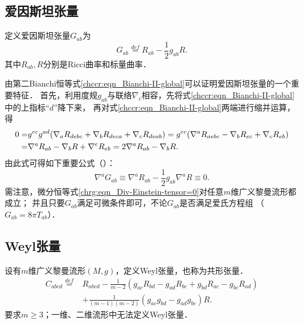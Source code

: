 \subsection{爱因斯坦张量}
定义爱因斯坦张量$G_{ab}$为
\begin{equation}\label{chrg:eqn_Einstein-tensor}
    G_{ab} \overset{def}{=} R_{ab} -\frac{1}{2}g_{ab} R .
\end{equation}
其中$R_{ab},R$分别是Ricci曲率和标量曲率．

由第二Bianchi恒等式\eqref{chccr:eqn_Bianchi-II-global}可以证明爱因斯坦张量的一个重要特征．
首先，利用度规$g_{ab}$与联络$\nabla_c$相容，先将式\eqref{chccr:eqn_Bianchi-II-global}中的上指标“$d$”降下来，
再对式\eqref{chccr:eqn_Bianchi-II-global}两端进行缩并运算，得
\begin{align}
   0=&  g^{ec}g^{ad}(\nabla_a R_{debc} + \nabla_b R_{deca} + \nabla_c R_{deab} )
   = g^{ec}(\nabla^a R_{aebc} - \nabla_b R_{ec} + \nabla_c R_{eb} ) \notag \\
   =& \nabla^a R_{ab} - \nabla_b R + \nabla^e R_{eb}
   = 2\nabla^a R_{ab} - \nabla_b R . \label{chrg:eqn_Bianchi-contract}
\end{align}
由此式可得如下重要公式（）：
\begin{equation}\label{chrg:eqn_Div-Einstein-tensor=0}
    \nabla^a G_{ab} \equiv \nabla^a R_{ab} -\frac{1}{2}g_{ab} \nabla^a R \equiv 0 .
\end{equation}
需注意，微分恒等式\eqref{chrg:eqn_Div-Einstein-tensor=0}对任意$m$维广义黎曼流形都成立；
并且只要$G_{ab}$满足可微条件即可，不论$G_{ab}$是否满足爱氏方程组
（$G_{ab}=8\pi T_{ab}$）．


\subsection{Weyl张量}
设有$m$维广义黎曼流形$(M,g)$，定义Weyl张量，也称为共形张量．
\begin{equation}\label{chrg:eqn_WeylConform-d4}
    \begin{aligned}
        C_{abcd}\overset{def}{=}& R_{abcd} - \frac{1}{m-2}\left( g_{ac}R_{bd} - g_{ad}R_{bc}
        + g_{bd}R_{ac} - g_{bc}R_{ad}\right)  \\
        &  + \frac{1}{(m-1)(m-2)}\left(g_{ac}g_{bd}-g_{ad}g_{bc}\right) R .
    \end{aligned}
\end{equation}
要求$m\geqslant3$；一维、二维流形中无法定义Weyl张量．

